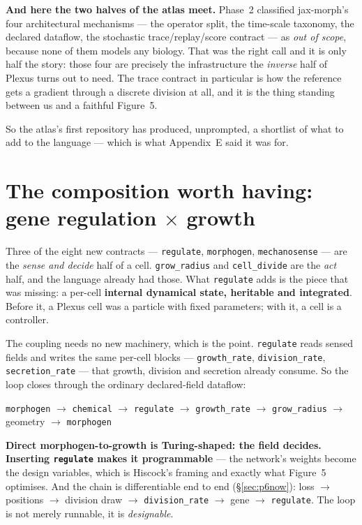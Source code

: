 \documentclass[11pt,a4paper]{article}
\newcommand{\code}[1]{\texttt{#1}}
\begin{document}
\textbf{And here the two halves of the atlas meet.} Phase~2 classified jax-morph's four
architectural mechanisms --- the operator split, the time-scale taxonomy, the declared dataflow,
the stochastic trace/replay/score contract --- as \emph{out of scope}, because none of them models
any biology. That was the right call and it is only half the story: those four are precisely the
infrastructure the \emph{inverse} half of Plexus turns out to need. The trace contract in
particular is how the reference gets a gradient through a discrete division at all, and it is the
thing standing between us and a faithful Figure~5.

So the atlas's first repository has produced, unprompted, a shortlist of what to add to the
language --- which is what Appendix~E said it was for.

\section{The composition worth having: gene regulation $\times$ growth}\label{sec:interplay}

Three of the eight new contracts --- \code{regulate}, \code{morphogen}, \code{mechanosense} ---
are the \emph{sense and decide} half of a cell. \code{grow\_radius} and \code{cell\_divide} are
the \emph{act} half, and the language already had those. What \code{regulate} adds is the piece
that was missing: a per-cell \textbf{internal dynamical state, heritable and integrated}. Before
it, a Plexus cell was a particle with fixed parameters; with it, a cell is a controller.

The coupling needs no new machinery, which is the point. \code{regulate} reads sensed fields and
writes the same per-cell blocks --- \code{growth\_rate}, \code{division\_rate},
\code{secretion\_rate} --- that growth, division and secretion already consume. So the loop
closes through the ordinary declared-field dataflow:

\begin{center}
\small
\code{morphogen} $\to$ \code{chemical} $\to$ \code{regulate} $\to$ \code{growth\_rate} $\to$
\code{grow\_radius} $\to$ geometry $\to$ \code{morphogen}
\end{center}

\textbf{Direct morphogen-to-growth is Turing-shaped: the field decides. Inserting \code{regulate}
makes it programmable} --- the network's weights become the design variables, which is Hiscock's
framing and exactly what Figure~5 optimises. And the chain is differentiable end to end
(\S\ref{sec:p6now}): loss $\to$ positions $\to$ division draw $\to$ \code{division\_rate} $\to$
gene $\to$ \code{regulate}. The loop is not merely runnable, it is \emph{designable}.
\end{document}
